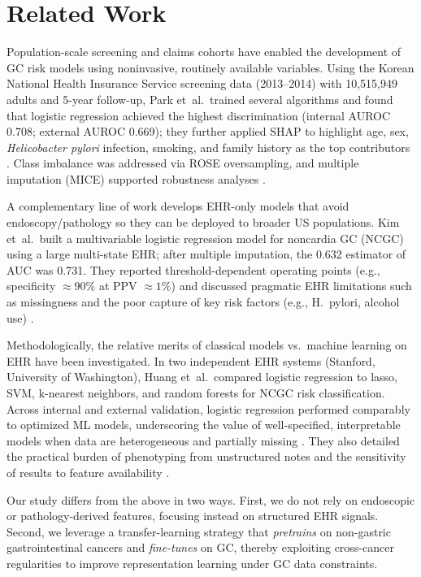 \documentclass[diagnostics,article,submit,pdftex,moreauthors]{Definitions/mdpi}
\begin{document}
\section{Related Work}
{
\color{red}
Population-scale screening and claims cohorts have enabled the development of GC risk models using noninvasive, routinely available variables. Using the Korean National Health Insurance Service screening data (2013--2014) with 10{,}515{,}949 adults and 5-year follow-up, Park et~al.\ trained several algorithms and found that logistic regression achieved the highest discrimination (internal AUROC 0.708; external AUROC 0.669); they further applied SHAP to highlight age, sex, \textit{Helicobacter pylori} infection, smoking, and family history as the top contributors \citep{park2024SHapley}. Class imbalance was addressed via ROSE oversampling, and multiple imputation (MICE) supported robustness analyses \citep{park2024SHapley}.

A complementary line of work develops EHR-only models that avoid endoscopy/pathology so they can be deployed to broader US populations. Kim et~al.\ built a multivariable logistic regression model for noncardia GC (NCGC) using a large multi-state EHR; after multiple imputation, the 0.632 estimator of AUC was 0.731. They reported threshold-dependent operating points (e.g., specificity $\approx90\%$ at PPV $\approx1\%$) and discussed pragmatic EHR limitations such as missingness and the poor capture of key risk factors (e.g., H.\ pylori, alcohol use) \citep{kim2024gastha}.

Methodologically, the relative merits of classical models vs.\ machine learning on EHR have been investigated. In two independent EHR systems (Stanford, University of Washington), Huang et~al.\ compared logistic regression to lasso, SVM, k-nearest neighbors, and random forests for NCGC risk classification. Across internal and external validation, logistic regression performed comparably to optimized ML models, underscoring the value of well-specified, interpretable models when data are heterogeneous and partially missing \citep{huang2022jco}. They also detailed the practical burden of phenotyping from unstructured notes and the sensitivity of results to feature availability \citep{huang2022jco}.

Our study differs from the above in two ways. First, we do not rely on endoscopic or pathology-derived features, focusing instead on structured EHR signals. Second, we leverage a transfer-learning strategy that \emph{pretrains} on non-gastric gastrointestinal cancers and \emph{fine-tunes} on GC, thereby exploiting cross-cancer regularities to improve representation learning under GC data constraints.
}
\end{document}
